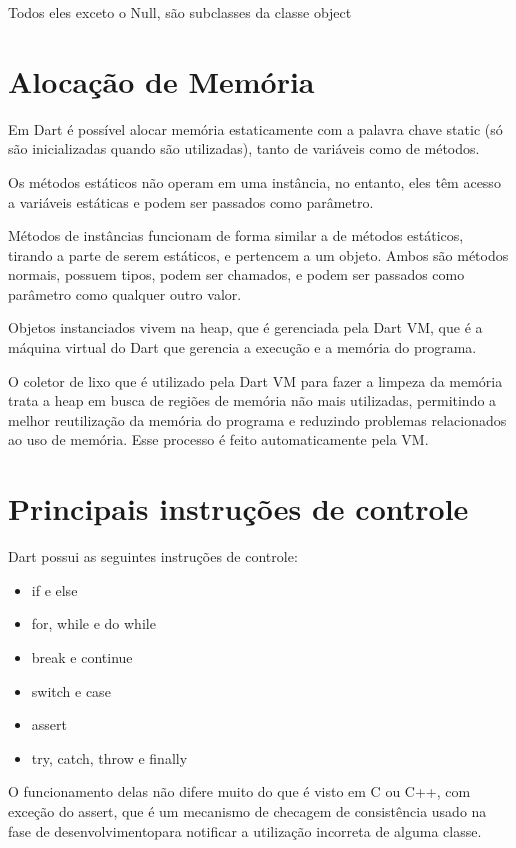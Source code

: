 \documentclass[12pt]{article}
\begin{document}
Todos eles exceto o Null, são subclasses da classe object

\section{Alocação de Memória}
Em Dart é possível alocar memória estaticamente com a palavra chave static (só são inicializadas quando são utilizadas), tanto de variáveis como de métodos.

Os métodos estáticos não operam em uma instância, no entanto, eles têm acesso a variáveis estáticas e podem ser passados como parâmetro.

Métodos de instâncias funcionam de forma similar a de métodos estáticos, tirando a parte de serem estáticos, e pertencem a um objeto. Ambos são métodos normais, possuem tipos, podem ser chamados, e podem ser passados como parâmetro como qualquer outro valor.

Objetos instanciados vivem na heap, que é gerenciada pela Dart VM, que é a máquina virtual do Dart que gerencia a execução e a memória do programa.

O coletor de lixo que é utilizado pela Dart VM para fazer a limpeza da memória trata a heap em busca de regiões de memória não mais utilizadas, permitindo a melhor reutilização da memória do programa e reduzindo problemas relacionados ao uso de memória. Esse processo é feito automaticamente pela VM.

\section{Principais instruções de controle}
Dart possui as seguintes instruções de controle:

\begin{itemize}
    \item if e else
    \item for, while e do while
    \item break e continue
    \item switch e case
    \item assert
    \item try, catch, throw e finally
\end{itemize}

    O funcionamento delas não difere muito do que é visto em C ou C++, com exceção do assert,
que é um mecanismo de checagem de consistência usado na fase de desenvolvimentopara notificar
a utilização incorreta de alguma classe.
\end{document}
